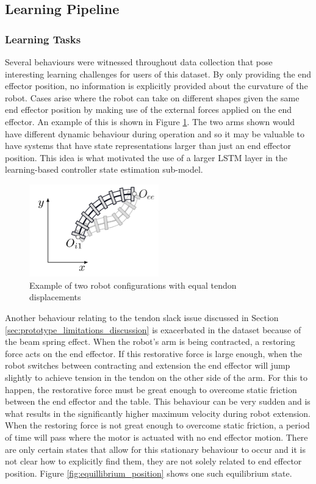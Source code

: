 \subsection{Learning Pipeline}
\subsubsection{Learning Tasks}
Several behaviours were witnessed throughout data collection that pose interesting learning challenges for users of this dataset. By only providing the end effector position, no information is explicitly provided about the curvature of the robot. Cases arise where the robot can take on different shapes given the same end effector position by making use of the external forces applied on the end effector. An example of this is shown in Figure \ref{fig:multiple_solutions}. The two arms shown would have different dynamic behaviour during operation and so it may be valuable to have systems that have state representations larger than just an end effector position. This idea is what motivated the use of a larger LSTM layer in the learning-based controller state estimation sub-model. 

\begin{figure}[h]
    \centering
    \includegraphics[width=0.5\textwidth]{images/multiple_solutions.png}
    \caption{Example of two robot configurations with equal tendon displacements}
    \label{fig:multiple_solutions}
\end{figure}

Another behaviour relating to the tendon slack issue discussed in Section \ref{sec:prototype_limitations_discussion} is exacerbated in the dataset because of the beam spring effect. When the robot's arm is being contracted, a restoring force acts on the end effector. If this restorative force is large enough, when the robot switches between contracting and extension the end effector will jump slightly to achieve tension in the tendon on the other side of the arm. For this to happen, the restorative force must be great enough to overcome static friction between the end effector and the table. This behaviour can be very sudden and is what results in the significantly higher maximum velocity during robot extension. When the restoring force is not great enough to overcome static friction, a period of time will pass where the motor is actuated with no end effector motion. There are only certain states that allow for this stationary behaviour to occur and it is not clear how to explicitly find them, they are not solely related to end effector position. Figure \ref{fig:equillibrium_position} shows one such equilibrium state. 

